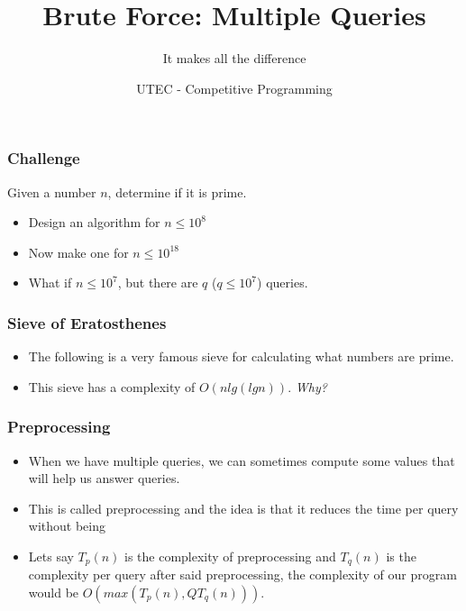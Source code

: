 \documentclass{beamer}
\begin{document}
\newcommand{\tabitem}{~~\llap{\textbullet}~~}




\title{Brute Force: Multiple Queries}
\subtitle{It makes all the difference}
\author{UTEC - Competitive Programming}
\date{}

\maketitle

\begin{frame}
	\frametitle{Challenge}

	Given a number $n$, determine if it is prime.

	\begin{itemize}
		\item<1-> Design an algorithm for  $n \leq 10^8$
		\item<2-> Now make one for $n \leq 10^{18}$
		\item<3-> What if $n \leq 10^7$, but there are $q$ ($q \leq 10^7$) queries.
	\end{itemize}
\end{frame}

\begin{frame}[fragile]
	\frametitle{Sieve of Eratosthenes}

	\begin{itemize}
		\item The following is a very famous sieve for calculating what numbers are prime.
		\item This sieve has a complexity of $O(nlg(lgn))$. \textit{Why?}
	\end{itemize}

	
\end{frame}

\begin{frame}
	\frametitle{Preprocessing}

	\begin{itemize}
		\item When we have multiple queries, we can sometimes compute some values that will help us answer queries.
		\item This is called preprocessing and the idea is that it reduces the time per query without being 
		\item Lets say $T_p(n)$ is the complexity of preprocessing and $T_q(n)$ is the complexity per query after said preprocessing, the complexity of our program would be $O(max(T_{p}(n), Q T_{q}(n)))$.
	\end{itemize}
\end{frame}
\end{document}
